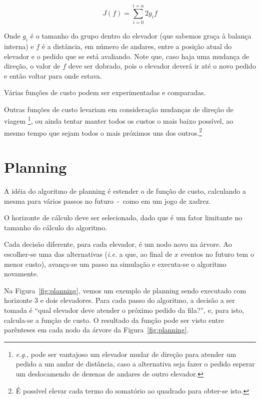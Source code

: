 \[
  J(f) = \sum_{i=0}^{i=n} 2g_{i}f
\]

Onde $g_{i}$ é o tamanho do grupo dentro do elevador (que sabemos graça à
balança interna) e $f$ é a distância, em número de andares,
entre a posição atual do elevador e o pedido que se está avaliando. Note que,
caso haja uma mudança de direção, o valor de $f$ deve ser dobrado, pois o
elevador deverá ir até o novo pedido e então voltar para onde estava.


Várias funções de custo podem ser experimentadas e comparadas.

Outras funções de custo levariam em consideração mudanças de direção de viagem
\footnote{\textit{e.g.}, pode ser vantajoso um elevador mudar de direção para atender um
pedido a um andar de distância, caso a alternativa seja fazer o pedido esperar
um deslocamendo de dezenas de andares de outro elevador.}, ou ainda tentar
manter todos os custos o mais baixo possível, ao mesmo tempo que sejam todos o
mais próximos uns dos outros.\footnote{É possível elevar cada termo do somatório ao
  quadrado para obter-se isto.}


\section{Planning}


A idéia do algoritmo de planning é estender o de função de custo, calculando a
mesma para vários passos no futuro~-~como em um jogo de xadrez.

O horizonte de cálculo deve ser selecionado, dado que é um fator limitante no
tamanho do cálculo do algoritmo.

Cada decisão diferente, para cada elevador, é um nodo novo na árvore. Ao
escolher-se uma das alternativas (\textit{i.e.} a que, ao final de $x$ eventos
no futuro tem o menor custo), avança-se um passo na simulação e executa-se o
algoritmo novamente.

Na Figura~\ref{fig:planning}, vemos um exemplo de planning sendo executado com
horizonte 3 e dois elevadores. Para cada passo do algoritmo, a decisão a ser
tomada é ``qual elevador deve atender o próximo pedido da fila?'', e, para isto,
calcula-se a função de custo. O resultado da função pode ser visto entre
parênteses em cada nodo da árvore da Figura~\ref{fig:planning}.

